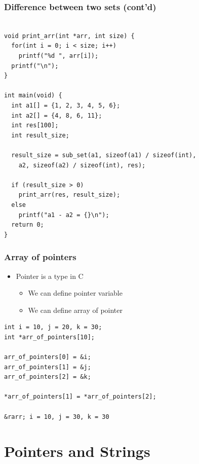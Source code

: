 \documentclass{../c-lecture}
\begin{document}
\begin{frame}[fragile]
  \frametitle{Difference between two sets (cont'd)}
  \scriptsize
  \begin{verbatim}

void print_arr(int *arr, int size) {
  for(int i = 0; i < size; i++)
    printf("%d ", arr[i]);
  printf("\n");
}

int main(void) {
  int a1[] = {1, 2, 3, 4, 5, 6};
  int a2[] = {4, 8, 6, 11};
  int res[100];
  int result_size;

  result_size = sub_set(a1, sizeof(a1) / sizeof(int),
    a2, sizeof(a2) / sizeof(int), res);

  if (result_size > 0)
    print_arr(res, result_size);
  else
    printf("a1 - a2 = {}\n");
  return 0;
}
  \end{verbatim}
\end{frame}

\begin{frame}[fragile]
  \frametitle{Array of pointers}
  \begin{itemize}
    \item Pointer is a type in C
    \begin{itemize}
      \item We can define pointer variable
      \item We can define array of pointer
    \end{itemize}
  \end{itemize}
  \begin{verbatim}
int i = 10, j = 20, k = 30;
int *arr_of_pointers[10];

arr_of_pointers[0] = &i;
arr_of_pointers[1] = &j;
arr_of_pointers[2] = &k;

*arr_of_pointers[1] = *arr_of_pointers[2];

&rarr; i = 10, j = 30, k = 30
  \end{verbatim}
\end{frame}

\section{Pointers and Strings}
\end{document}
